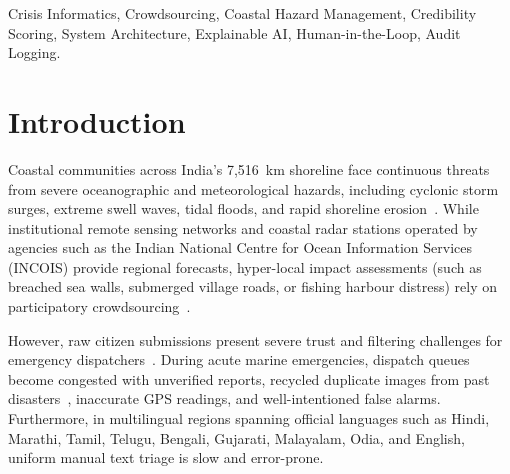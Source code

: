 \documentclass[conference]{IEEEtran}
\begin{document}
\begin{IEEEkeywords}
Crisis Informatics, Crowdsourcing, Coastal Hazard Management, Credibility Scoring, System Architecture, Explainable AI, Human-in-the-Loop, Audit Logging.
\end{IEEEkeywords}

\section{Introduction}
Coastal communities across India's 7,516~km shoreline face continuous threats from severe oceanographic and meteorological hazards, including cyclonic storm surges, extreme swell waves, tidal floods, and rapid shoreline erosion~\cite{kumar2012incois, mohapatra2012cyclone}. While institutional remote sensing networks and coastal radar stations operated by agencies such as the Indian National Centre for Ocean Information Services (INCOIS) provide regional forecasts, hyper-local impact assessments (such as breached sea walls, submerged village roads, or fishing harbour distress) rely on participatory crowdsourcing~\cite{okolloh2009ushahidi, sakaki2010earthquake}.

However, raw citizen submissions present severe trust and filtering challenges for emergency dispatchers~\cite{castillo2011information, imran2015processing}. During acute marine emergencies, dispatch queues become congested with unverified reports, recycled duplicate images from past disasters~\cite{gupta2013faking}, inaccurate GPS readings, and well-intentioned false alarms. Furthermore, in multilingual regions spanning official languages such as Hindi, Marathi, Tamil, Telugu, Bengali, Gujarati, Malayalam, Odia, and English, uniform manual text triage is slow and error-prone.
\end{document}
